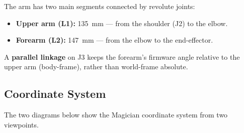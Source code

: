 \documentclass[11pt,a4paper]{article}
\begin{document}
The arm has two main segments connected by revolute joints:
\begin{itemize}
  \item \textbf{Upper arm (L1):} \qty{135}{\mm} --- from the shoulder (J2) to the elbow.
  \item \textbf{Forearm (L2):} \qty{147}{\mm} --- from the elbow to the end-effector.
\end{itemize}

A \textbf{parallel linkage} on J3 keeps the forearm's firmware angle relative to the upper arm (body-frame), rather than world-frame absolute.

\subsection{Coordinate System}

The two diagrams below show the Magician coordinate system from two viewpoints.
\end{document}
